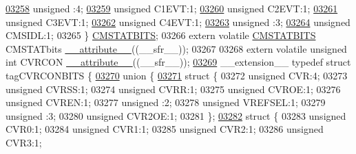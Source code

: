 \begin{DoxyCode}
\hypertarget{a00015_source_l03258}{}\hyperlink{a00014_adf71f3d8410c1f1dbbc96680a92c49af}{03258}   \textcolor{keywordtype}{unsigned} :4;
\hypertarget{a00015_source_l03259}{}\hyperlink{a00014_acb7ee136b83067f36d2dadab8625b1a7}{03259}   \textcolor{keywordtype}{unsigned} C1EVT:1;
\hypertarget{a00015_source_l03260}{}\hyperlink{a00014_aec68f11a447fc00b2a632bb8aae3899e}{03260}   \textcolor{keywordtype}{unsigned} C2EVT:1;
\hypertarget{a00015_source_l03261}{}\hyperlink{a00014_a12277a444d526f913bb692c4aff46c78}{03261}   \textcolor{keywordtype}{unsigned} C3EVT:1;
\hypertarget{a00015_source_l03262}{}\hyperlink{a00014_a8cb94c32ab97dbd81bac22bf1317e706}{03262}   \textcolor{keywordtype}{unsigned} C4EVT:1;
\hypertarget{a00015_source_l03263}{}\hyperlink{a00014_acaf2d0924a107ec6e8d2e31febaf66f9}{03263}   \textcolor{keywordtype}{unsigned} :3;
\hypertarget{a00015_source_l03264}{}\hyperlink{a00014_ade32d9beff74e352daa224124b7f49d2}{03264}   \textcolor{keywordtype}{unsigned} CMSIDL:1;
03265 \} \hyperlink{a00014_d9/d48/a00345}{CMSTATBITS};
03266 \textcolor{keyword}{extern} \textcolor{keyword}{volatile} \hyperlink{a00014_d9/d48/a00345}{CMSTATBITS} CMSTATbits \hyperlink{a00015_a493c46f03454991ccc5aa7a6e1dfb2a7}{\_\_attribute\_\_}((\_\_sfr\_\_));
03267 
03268 \textcolor{keyword}{extern} \textcolor{keyword}{volatile} \textcolor{keywordtype}{unsigned} \textcolor{keywordtype}{int}  CVRCON \hyperlink{a00015_a493c46f03454991ccc5aa7a6e1dfb2a7}{\_\_attribute\_\_}((\_\_sfr\_\_));
\hypertarget{a00015_source_l03269}{}\hyperlink{a00014}{03269} \_\_extension\_\_ \textcolor{keyword}{typedef} \textcolor{keyword}{struct }tagCVRCONBITS \{
\hypertarget{a00015_source_l03270}{}\hyperlink{a00015}{03270}   \textcolor{keyword}{union }\{
\hypertarget{a00015_source_l03271}{}\hyperlink{a00015}{03271}     \textcolor{keyword}{struct }\{
03272       \textcolor{keywordtype}{unsigned} CVR:4;
03273       \textcolor{keywordtype}{unsigned} CVRSS:1;
03274       \textcolor{keywordtype}{unsigned} CVRR:1;
03275       \textcolor{keywordtype}{unsigned} CVROE:1;
03276       \textcolor{keywordtype}{unsigned} CVREN:1;
03277       \textcolor{keywordtype}{unsigned} :2;
03278       \textcolor{keywordtype}{unsigned} VREFSEL:1;
03279       \textcolor{keywordtype}{unsigned} :3;
03280       \textcolor{keywordtype}{unsigned} CVR2OE:1;
03281     \};
\hypertarget{a00015_source_l03282}{}\hyperlink{a00015}{03282}     \textcolor{keyword}{struct }\{
03283       \textcolor{keywordtype}{unsigned} CVR0:1;
03284       \textcolor{keywordtype}{unsigned} CVR1:1;
03285       \textcolor{keywordtype}{unsigned} CVR2:1;
03286       \textcolor{keywordtype}{unsigned} CVR3:1;

\end{DoxyCode}
